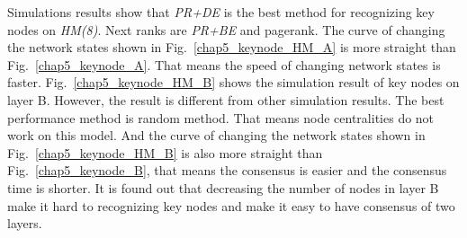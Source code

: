 Simulations results show that \textit{PR+DE} is the best method for recognizing key nodes on \textit{HM(8)}. Next ranks are \textit{PR+BE} and pagerank. The curve of changing the network states shown in Fig.~\ref{chap5_keynode_HM_A} is more straight than Fig.~\ref{chap5_keynode_A}. That means the speed of changing network states is faster. 
Fig.~\ref{chap5_keynode_HM_B} shows the simulation result of key nodes on layer B. However, the result is different from other simulation results. The best performance method is random method. That means node centralities do not work on this model. And the curve of changing the network states shown in Fig.~\ref{chap5_keynode_HM_B} is also more straight than Fig.~\ref{chap5_keynode_B}, that means the consensus is easier and the consensus time is shorter. It is found out that decreasing the number of nodes in layer B make it hard to recognizing key nodes and make it easy to have consensus of two layers. 

